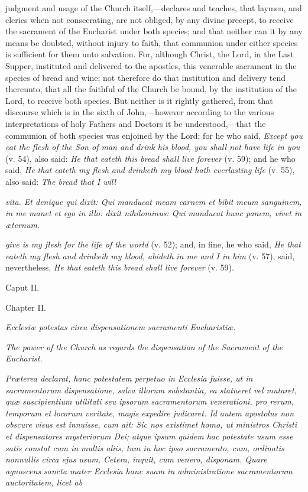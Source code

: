 judgment and usage of the Church itself,—declares and teaches, that laymen, and clerics when not consecrating, are not obliged, by any divine precept, to receive the sacrament of the Eucharist under both species; and that neither can it by any means be doubted, without injury to faith, that communion under either species is sufficient for them unto salvation. For, although Christ, the Lord, in the Last Supper, instituted and delivered to the apostles, this venerable sacrament in the species of bread and wine; not therefore do that institution and delivery tend thereunto, that all the faithful of the Church be bound, by the institution of the Lord, to receive both species. But neither is it rightly gathered, from that discourse which is in the sixth of John,—however according to the various interpretations of holy Fathers and Doctors it be understood,—that the communion of both species was enjoined by the Lord; for he who said, \emph{Except you eat the flesh of the Son of man and drink his blood, you shall not have life in you} (v. 54), also said: \emph{He that eateth this bread shall live forever} (v. 59); and he who said, \emph{He that eateth my flesh and drinketh my blood hath everlasting life} (v. 55), also said: \emph{The bread that I will}

\emph{vita. Et denique qui dixit: Qui manducat meam carnem et bibit meum sanguinem, in me manet et ego in illo: dixit nihilominus: Qui manducat hunc panem, vivet in æternum.}

\emph{give is my flesh for the life of the world} (v. 52); and, in fine, he who said, \emph{He that eateth my flesh and drinkeih my blood, abideth in me and I in him} (v. 57), said, nevertheless, \emph{He that eateth this bread shall live forever} (v. 59).

Caput II.

Chapter II.

\emph{Ecclesiæ potestas circa dispensationem sacramenti Eucharistiæ.}

\emph{The power of the Church as regards the dispensation of the Sacrament of the Eucharist.}

\emph{Præterea declarat, hanc potestatem perpetuo in Ecclesia fuisse, ut in sacramentorum dispensatione, salva illorum substantia, ea statueret vel mutaret, quæ suscipientium utilitati seu ipsorum sacramentorum venerationi, pro rerum, temporum et locorum veritate, magis expedire judicaret. Id autem apostolus non obscure visus est innuisse, cum ait: Sic nos existimet homo, ut ministros Christi et dispensatores mysteriorum Dei; atque ipsum quidem hac potestate usum esse satis constat cum in multis aliis, tum in hoc ipso sacramento, cum, ordinatis nonnullis circa ejus usum, Cetera, inquit, cum venero, disponam. Quare agnoscens sancta mater Ecclesia hanc suam in administratione sacramentorum auctoritatem, licet ab }


